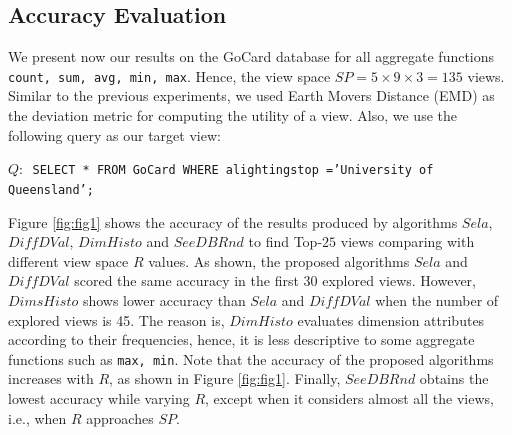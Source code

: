 \subsection{Accuracy Evaluation}
\label{sec:results_gocard}
%
We present now our results on the GoCard database for all aggregate functions \texttt{count, sum, avg, min, max}. 
%
Hence, the view space $SP = 5 \times 9 \times 3 = 135$ views.
%
Similar to the previous experiments, we used Earth Movers Distance (EMD) as the deviation metric for computing the utility of a view.
%
Also, we use the following query as our target view:
%
\begin{center}
\texttt{$Q:$ SELECT * FROM GoCard WHERE alightingstop ='University of Queensland';}
\end{center}
%
%

Figure \ref{fig:fig1} shows the accuracy of the results produced by algorithms $Sela$, $Diff DVal$, $DimHisto$ and $SeeDB Rnd$ to find Top-$25$ views comparing with different view space $R$ values. 
%
As shown, the proposed algorithms $Sela$ and $Diff DVal$ scored the same accuracy in the first 30 explored views. 
%
However, $DimsHisto$ shows lower accuracy than $Sela$ and $Diff DVal$ when the number of explored views is 45. 
%
The reason is, $DimHisto$ evaluates dimension attributes according to their frequencies, hence, it is less descriptive to some aggregate functions such as \texttt{max, min}.  
%
Note that the accuracy of the proposed algorithms increases with $R$, as shown in Figure \ref{fig:fig1}.
Finally, $SeeDB Rnd$ obtains the lowest accuracy while varying $R$, except when it considers almost all the views, i.e., when $R$ approaches $SP$. 
%

